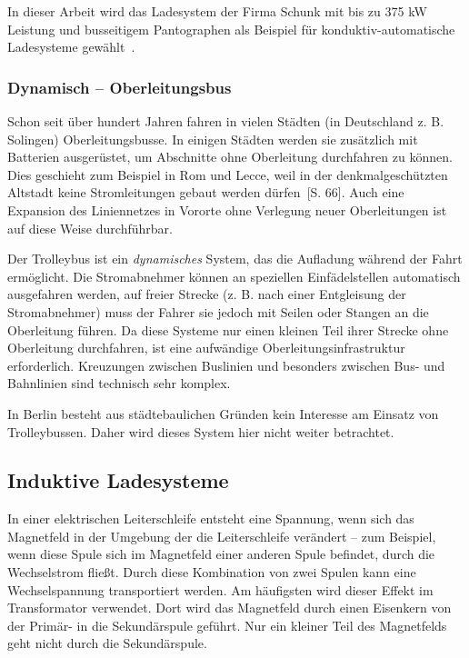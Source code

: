In dieser Arbeit wird das Ladesystem der Firma Schunk mit bis zu 375 kW Leistung und busseitigem Pantographen als Beispiel für konduktiv-automatische Ladesysteme gewählt~\cite{Weigel:2013}.

\subsubsection{Dynamisch – Oberleitungsbus} 
Schon seit über hundert Jahren fahren in vielen Städten (in Deutschland z. B. Solingen) Oberleitungsbusse. In einigen Städten werden sie zusätzlich mit Batterien ausgerüstet, um Abschnitte ohne Oberleitung durchfahren zu können. Dies geschieht zum Beispiel in Rom und Lecce, weil in der denkmalgeschützten Altstadt keine Stromleitungen gebaut werden dürfen~\cite{tub_aleph001746639}[S. 66]. Auch eine Expansion des Liniennetzes in Vororte ohne Verlegung neuer Oberleitungen ist auf diese Weise durchführbar.

Der Trolleybus ist ein \emph{dynamisches} System, das die Aufladung während der Fahrt ermöglicht. Die Stromabnehmer können an speziellen Einfädelstellen automatisch ausgefahren werden, auf freier Strecke (z. B. nach einer Entgleisung der Stromabnehmer) muss der Fahrer sie jedoch mit Seilen oder Stangen an die Oberleitung führen. Da diese Systeme nur einen kleinen Teil ihrer Strecke ohne Oberleitung durchfahren, ist eine aufwändige Oberleitungsinfrastruktur erforderlich. Kreuzungen zwischen Buslinien und besonders zwischen Bus- und Bahnlinien sind technisch sehr komplex.

In Berlin besteht aus städtebaulichen Gründen kein Interesse am Einsatz von Trolleybussen. Daher wird dieses System hier nicht weiter betrachtet.
                                 
\subsection{Induktive Ladesysteme}
In einer elektrischen Leiterschleife entsteht eine Spannung, wenn sich das Magnetfeld in der Umgebung der die Leiterschleife verändert – zum Beispiel, wenn diese Spule sich im Magnetfeld einer anderen Spule befindet, durch die Wechselstrom fließt. Durch diese Kombination von zwei Spulen kann eine Wechselspannung transportiert werden. Am häufigsten wird dieser Effekt im Transformator verwendet. Dort wird das Magnetfeld durch einen Eisenkern von der Primär- in die Sekundärspule geführt. Nur ein kleiner Teil des Magnetfelds geht nicht durch die Sekundärspule.

